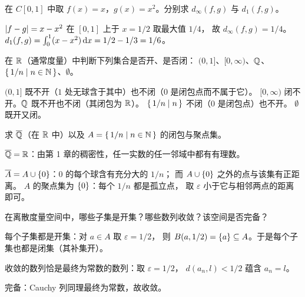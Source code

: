 \begin{exercise}[例行]
  \label{exr:CX-distance}
  在 \(C[0,1]\) 中取 \(f(x)=x\)，\(g(x)=x^{2}\)。分别求 \(d_{\infty}(f,g)\)
  与 \(d_{1}(f,g)\)。
  \begin{solution}
    \(\lvert f-g\rvert = x - x^{2}\) 在 \([0,1]\) 上于 \(x=1/2\) 取最大值 \(1/4\)，
    故 \(d_{\infty}(f,g) = 1/4\)。
    \(d_{1}(f,g) = \int_{0}^{1}(x-x^{2})\mathop{}\!\mathrm{d} x = 1/2 - 1/3 = 1/6\)。
  \end{solution}
\end{exercise}

\begin{exercise}[例行]
  \label{exr:open-closed-check}
  在 \(\mathbb{R}\)（通常度量）中判断下列集合是否开、是否闭：
  \((0,1]\)、\([0,\infty)\)、\(\mathbb{Q}\)、\(\left\{\,1/n \;\middle|\; n \in \mathbb{N}\,\right\}\)、\(\emptyset\)。
  \begin{solution}
    \((0,1]\) 既不开（\(1\) 处无球含于其中）也不闭（\(0\) 是闭包点而不属于它）。
    \([0,\infty)\) 闭不开。\(\mathbb{Q}\) 既不开也不闭（其闭包为 \(\mathbb{R}\)）。
    \(\left\{\,1/n \;\middle|\; n\,\right\}\) 不闭（\(0\) 是闭包点）也不开。
    \(\emptyset\) 既开又闭。
  \end{solution}
\end{exercise}

\begin{exercise}[例行]
  \label{exr:closure-compute}
  求 \(\overline{\mathbb{Q}}\)（在 \(\mathbb{R}\) 中）以及 \(A = \left\{\,1/n \;\middle|\; n \in \mathbb{N}\,\right\}\) 的闭包与聚点集。
  \begin{solution}
    \(\overline{\mathbb{Q}} = \mathbb{R}\)：由第 1 章的稠密性，任一实数的任一邻域中都有有理数。

    \(\overline{A} = A \cup \left\{0\right\}\)：\(0\) 的每个球含有充分大的 \(1/n\)；
    而 \(A \cup \left\{0\right\}\) 之外的点与该集有正距离。
    \(A\) 的聚点集为 \(\left\{0\right\}\)：每个 \(1/n\) 都是孤立点，
    取 \(\varepsilon\) 小于它与相邻两点的距离即可。
  \end{solution}
\end{exercise}

\begin{exercise}[例行]
  \label{exr:discrete}
  在离散度量空间中，哪些子集是开集？哪些数列收敛？该空间是否完备？
  \begin{solution}
    每个子集都是开集：对 \(a \in A\) 取 \(\varepsilon = 1/2\)，
    则 \(B(a,1/2) = \left\{a\right\} \subseteq A\)。于是每个子集也都是闭集（其补集开）。

    收敛的数列恰是最终为常数的数列：取 \(\varepsilon=1/2\)，
    \(d(a_{n},l)<1/2\) 蕴含 \(a_{n}=l\)。

    完备：Cauchy 列同理最终为常数，故收敛。
  \end{solution}
\end{exercise}

